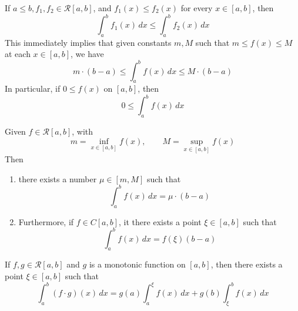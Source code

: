   \begin{lemma}
    If $a \leq b, f_1, f_2 \in \mathcal{R}[a, b]$, and $f_1 (x) \leq f_2 (x)$ for every $x \in [a, b]$, then
    \begin{equation}
      \int_a^b f_1 (x)\,dx \leq \int_a^b f_2 (x)\,dx
    \end{equation}
    This immediately implies that given constants $m, M$ such that $m \leq f(x) \leq M$ at each $x \in [a, b]$, we have
    \begin{equation}
      m \cdot (b - a) \leq \int_a^b f(x)\,dx \leq M \cdot (b-a)
    \end{equation}
    In particular, if $0 \leq f(x)$ on $[a, b]$, then
    \begin{equation}
      0 \leq \int_a^b f(x)\,dx
    \end{equation}
  \end{lemma}

  \begin{theorem}
    Given $f \in \mathcal{R}[a, b]$, with 
    \begin{equation}
      m = \inf_{x \in [a, b]} f(x), \qquad M = \sup_{x \in [a, b]} f(x)
    \end{equation}
    Then 
    \begin{enumerate}
      \item there exists a number $\mu \in [m, M]$ such that
      \begin{equation}
        \int_a^b f(x)\,dx = \mu \cdot (b - a)
      \end{equation}

      \item Furthermore, if $f \in C[a, b]$, it there exists a point $\xi \in [a, b]$ such that
      \begin{equation}
        \int_a^b f(x)\,dx = f(\xi) (b - a)
      \end{equation}
    \end{enumerate}
  \end{theorem}

  \begin{theorem}
    If $f, g \in \mathcal{R}[a, b]$ and $g$ is a monotonic function on $[a, b]$, then there exists a point $\xi \in [a, b]$ such that
    \begin{equation}
      \int_a^b (f \cdot g) (x)\,dx = g(a) \int_a^\xi f(x)\,dx + g(b) \int_\xi^b f(x)\,dx
    \end{equation}
  \end{theorem}

